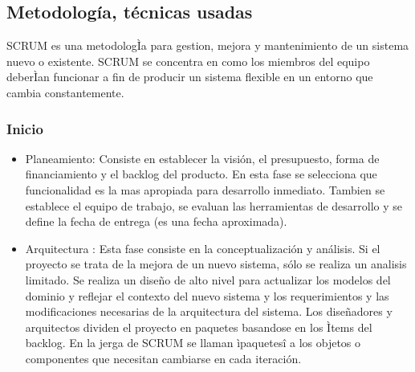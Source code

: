 \documentclass[preprint,12pt]{elsarticle}
\begin{document}

\subsection{\textbf{Metodología, técnicas usadas}}

SCRUM es una metodologÌa para gestion, mejora y mantenimiento de un sistema nuevo o existente. SCRUM se concentra en como los miembros del equipo deberÌan funcionar a fin de producir un sistema flexible en un entorno que cambia constantemente. \cite{ScrumDef}

\subsubsection{\textbf{Inicio}}

\begin{itemize}
\item Planeamiento: Consiste en establecer la visión, el presupuesto, forma de financiamiento y el backlog del producto. En esta fase se selecciona que funcionalidad es la mas apropiada para desarrollo inmediato. Tambien se establece el equipo de trabajo, se evaluan las herramientas de desarrollo y se define la fecha de entrega (es una fecha aproximada). \cite{ScrumDef}

\item Arquitectura : Esta fase consiste en la conceptualización y análisis. Si el proyecto se trata de la mejora de un nuevo sistema, sólo se realiza un analisis limitado. Se realiza un diseño de alto nivel para actualizar los modelos del dominio y reflejar el contexto del nuevo sistema y los requerimientos y las modificaciones necesarias de la arquitectura del sistema. Los diseñadores y arquitectos dividen el proyecto en paquetes basandose en los Ìtems del backlog. En la jerga de SCRUM se llaman ìpaquetesî a los objetos o componentes que necesitan cambiarse en cada iteración. \cite{ScrumDef}
\end{itemize}
\end{document}
